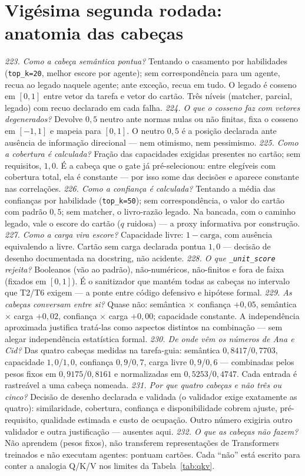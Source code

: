 \section{Vigésima segunda rodada: anatomia das cabeças}
\textit{223. Como a cabeça semântica pontua?} Tentando o casamento por habilidades (\texttt{top\_k=20}, melhor escore por agente); sem correspondência para um agente, recua ao legado naquele agente; ante exceção, recua em tudo. O legado é cosseno em $[0,1]$ entre vetor da tarefa e vetor do cartão. Três níveis (matcher, parcial, legado) com recuo declarado em cada falha.
\textit{224. O que o cosseno faz com vetores degenerados?} Devolve $0{,}5$ neutro ante normas nulas ou não finitas, fixa o cosseno em $[-1,1]$ e mapeia para $[0,1]$. O neutro $0{,}5$ é a posição declarada ante ausência de informação direcional --- nem otimismo, nem pessimismo.
\textit{225. Como a cobertura é calculada?} Fração das capacidades exigidas presentes no cartão; sem requisitos, $1{,}0$. É a cabeça que o gate já pré-selecionou: entre elegíveis com cobertura total, ela é constante --- por isso some das decisões e aparece constante nas correlações.
\textit{226. Como a confiança é calculada?} Tentando a média das confianças por habilidade (\texttt{top\_k=50}); sem correspondência, o valor do cartão com padrão $0{,}5$; sem matcher, o livro-razão legado. Na bancada, com o caminho legado, vale o escore do cartão ($q$ ruidosa) --- a proxy informativa por construção.
\textit{227. Como a carga vira escore?} Capacidade livre: $1-\mathrm{carga}$, com ausência equivalendo a livre. Cartão sem carga declarada pontua $1{,}0$ --- decisão de desenho documentada na docstring, não acidente.
\textit{228. O que \texttt{\_unit\_score} rejeita?} Booleanos (vão ao padrão), não-numéricos, não-finitos e fora de faixa (fixados em $[0,1]$). É o sanitizador que mantém todas as cabeças no intervalo que T2/T6 exigem --- a ponte entre código defensivo e hipótese formal.
\textit{229. As cabeças conversam entre si?} Quase não: semântica $\times$ confiança $+0{,}05$, semântica $\times$ carga $+0{,}02$, confiança $\times$ carga $+0{,}00$; capacidade constante. A independência aproximada justifica tratá-las como aspectos distintos na combinação --- sem alegar independência estatística formal.
\textit{230. De onde vêm os números de Ana e Cid?} Das quatro cabeças medidas na tarefa-guia: semântica $0{,}8417$/$0{,}7703$, capacidade $1{,}0$/$1{,}0$, confiança $0{,}9$/$0{,}7$, carga livre $0{,}9$/$0{,}6$ --- combinadas pelos pesos fixos em $0{,}9175$/$0{,}8161$ e normalizadas em $0{,}5253$/$0{,}4747$. Cada entrada é rastreável a uma cabeça nomeada.
\textit{231. Por que quatro cabeças e não três ou cinco?} Decisão de desenho declarada e validada (o validador exige exatamente as quatro): similaridade, cobertura, confiança e disponibilidade cobrem ajuste, pré-requisito, qualidade estimada e custo de ocupação. Outro número exigiria outro validador e outra justificação --- ausentes aqui.
\textit{232. O que as cabeças não fazem?} Não aprendem (pesos fixos), não transferem representações de Transformers treinados e não executam agentes: pontuam cartões. Cada ``não'' está escrito para conter a analogia Q/K/V nos limites da Tabela~\ref{tab:qkv}.

